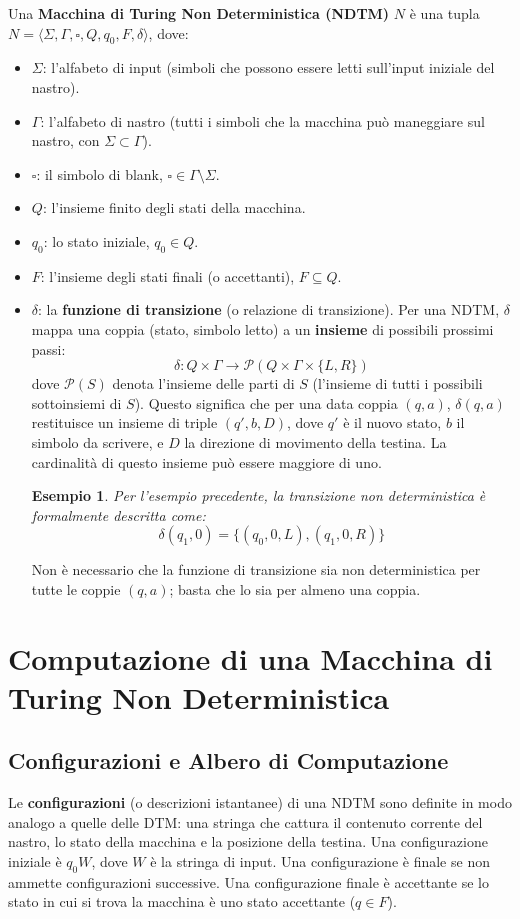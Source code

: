 \documentclass[a4paper]{article}
\newtheorem{example}{Esempio}
\newcommand{\blankS}{\ensuremath{\square}}
\begin{document}
Una \textbf{Macchina di Turing Non Deterministica (NDTM)} $N$ è una tupla $N = \langle \Sigma, \Gamma, \blankS, Q, q_0, F, \delta \rangle$, dove:
\begin{itemize}
    \item $\Sigma$: l'alfabeto di input (simboli che possono essere letti sull'input iniziale del nastro).
    \item $\Gamma$: l'alfabeto di nastro (tutti i simboli che la macchina può maneggiare sul nastro, con $\Sigma \subset \Gamma$).
    \item $\blankS$: il simbolo di blank, $\blankS \in \Gamma \setminus \Sigma$.
    \item $Q$: l'insieme finito degli stati della macchina.
    \item $q_0$: lo stato iniziale, $q_0 \in Q$.
    \item $F$: l'insieme degli stati finali (o accettanti), $F \subseteq Q$.
    \item $\delta$: la \textbf{funzione di transizione} (o relazione di transizione). Per una NDTM, $\delta$ mappa una coppia (stato, simbolo letto) a un \textbf{insieme} di possibili prossimi passi:
    \[ \delta: Q \times \Gamma \to \mathcal{P}(Q \times \Gamma \times \{L, R\}) \]
    dove $\mathcal{P}(S)$ denota l'insieme delle parti di $S$ (l'insieme di tutti i possibili sottoinsiemi di $S$). Questo significa che per una data coppia $(q, a)$, $\delta(q, a)$ restituisce un insieme di triple $(q', b, D)$, dove $q'$ è il nuovo stato, $b$ il simbolo da scrivere, e $D$ la direzione di movimento della testina. La cardinalità di questo insieme può essere maggiore di uno.

    \begin{example}
    Per l'esempio precedente, la transizione non deterministica è formalmente descritta come:
    \[ \delta(q_1, 0) = \{ (q_0, 0, L), (q_1, 0, R) \} \]
    \end{example}
    Non è necessario che la funzione di transizione sia non deterministica per tutte le coppie $(q,a)$; basta che lo sia per almeno una coppia.
\end{itemize}

\section{Computazione di una Macchina di Turing Non Deterministica}

\subsection{Configurazioni e Albero di Computazione}
Le \textbf{configurazioni} (o descrizioni istantanee) di una NDTM sono definite in modo analogo a quelle delle DTM: una stringa che cattura il contenuto corrente del nastro, lo stato della macchina e la posizione della testina.
Una configurazione iniziale è $q_0W$, dove $W$ è la stringa di input.
Una configurazione è finale se non ammette configurazioni successive. Una configurazione finale è accettante se lo stato in cui si trova la macchina è uno stato accettante ($q \in F$).
\end{document}
